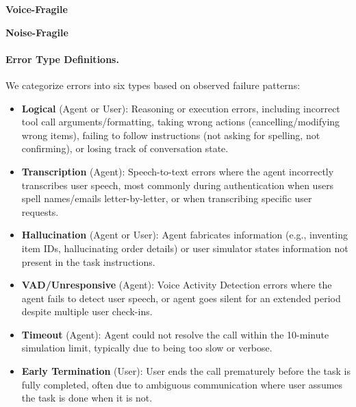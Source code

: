 \begin{table}[h]
\caption{Qualitative error annotations for task completion failures. Left: Voice-Fragile cohort (43 simulations from Clean audio setting). Right: Noise-Fragile cohort (48 simulations from Realistic audio setting).}
\label{tab:full-notes-both}
\centering
\begin{small}
\begin{minipage}{0.48\textwidth}
\centering
\textbf{Voice-Fragile}\\[0.5em]

\end{minipage}
\hfill
\begin{minipage}{0.48\textwidth}
\centering
\textbf{Noise-Fragile}\\[0.5em]

\end{minipage}
\end{small}
\end{table}

\paragraph{Error Type Definitions.}
We categorize errors into six types based on observed failure patterns:

\begin{itemize}[nosep,leftmargin=*]
    \item \textbf{Logical} (Agent or User): Reasoning or execution errors, including incorrect tool call arguments/formatting, taking wrong actions (cancelling/modifying wrong items), failing to follow instructions (not asking for spelling, not confirming), or losing track of conversation state.
    
    \item \textbf{Transcription} (Agent): Speech-to-text errors where the agent incorrectly transcribes user speech, most commonly during authentication when users spell names/emails letter-by-letter, or when transcribing specific user requests.
    
    \item \textbf{Hallucination} (Agent or User): Agent fabricates information (e.g., inventing item IDs, hallucinating order details) or user simulator states information not present in the task instructions.
    
    \item \textbf{VAD/Unresponsive} (Agent): Voice Activity Detection errors where the agent fails to detect user speech, or agent goes silent for an extended period despite multiple user check-ins.
    
    \item \textbf{Timeout} (Agent): Agent could not resolve the call within the 10-minute simulation limit, typically due to being too slow or verbose.
    
    \item \textbf{Early Termination} (User): User ends the call prematurely before the task is fully completed, often due to ambiguous communication where user assumes the task is done when it is not.
\end{itemize}

